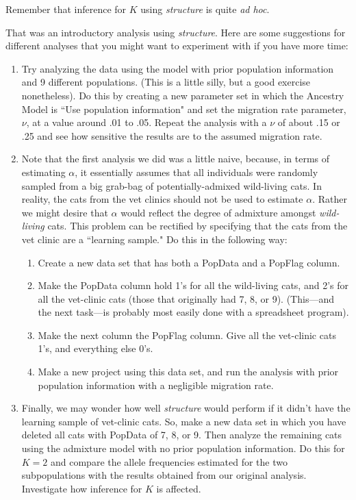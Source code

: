 Remember that inference for $K$ using {\em structure} is quite {\em ad hoc}. 

That was an introductory analysis using {\em structure}.  Here are some suggestions for different analyses that you might want to experiment with if you have more time:

\begin{enumerate}
\item Try analyzing the data using the model with prior population information and 9 different populations.  (This is a little silly, but a good exercise nonetheless).  Do this by creating a new parameter set in which the Ancestry Model is ``Use population information" and set the migration rate parameter, $\nu$, at a value around .01 to .05.  Repeat the analysis with a $\nu$ of about .15 or .25 and see how sensitive the results are to the assumed migration rate. 
\item Note that the first analysis we did was a little naive, because, in terms of estimating $\alpha$, it essentially assumes that all individuals were randomly sampled from a big grab-bag of potentially-admixed wild-living cats.  In reality, the cats from the vet clinics should not be used to estimate $\alpha$.  Rather we might desire that $\alpha$ would reflect the degree of admixture amongst {\em wild-living} cats.  This problem can be rectified by specifying that the cats from the vet clinic are a ``learning sample."  Do this in the following way:
\begin{enumerate}
\item Create a new data set that has both a PopData and a PopFlag column.  
\item Make the PopData column hold 1's for all the wild-living cats, and 2's for all the vet-clinic cats (those that originally had 7, 8, or 9).  (This---and the next task---is probably most easily done with a spreadsheet program).  
\item Make the next column the PopFlag column.  Give all the vet-clinic cats 1's, and everything else 0's. 
\item Make a new project using this data set, and run the analysis with prior population information with a negligible migration rate.  

\end{enumerate}
\item Finally, we may wonder how well {\em structure} would perform if it didn't have the learning sample of vet-clinic cats.  So, make a new data set in which you have deleted all cats with PopData of 7, 8, or 9.  Then analyze the remaining cats using the admixture model with no prior population information.  Do this for $K=2$ and compare the allele frequencies estimated for the two subpopulations with the results obtained from our original analysis.  Investigate how inference for $K$ is affected.  
\end{enumerate}


